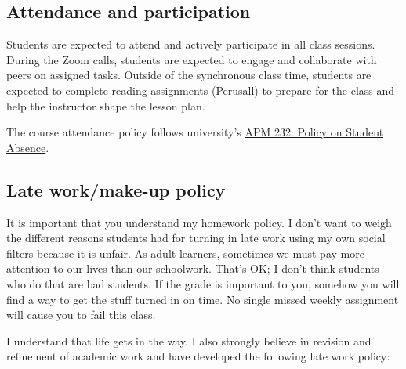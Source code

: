 \hypertarget{attendance-and-participation}{%
\subsection{Attendance and
participation}\label{attendance-and-participation}}

Students are expected to attend and actively participate in all class
sessions. During the Zoom calls, students are expected to engage and
collaborate with peers on assigned tasks. Outside of the synchronous
class time, students are expected to complete reading assignments
(Perusall) to prepare for the class and help the instructor shape the
lesson plan.

The course attendance policy follows university's
\href{http://www.fresnostate.edu/academics/facultyaffairs/documents/apm/232.pdf}{APM
232: Policy on Student Absence}.

\hypertarget{late-workmake-up-policy}{%
\subsection{Late work/make-up policy}\label{late-workmake-up-policy}}

It is important that you understand my homework policy. I don't want to
weigh the different reasons students had for turning in late work using
my own social filters because it is unfair. As adult learners, sometimes
we must pay more attention to our lives than our schoolwork. That's OK;
I don't think students who do that are bad students. If the grade is
important to you, somehow you will find a way to get the stuff turned in
on time. No single missed weekly assignment will cause you to fail this
class.

I understand that life gets in the way. I also strongly believe in
revision and refinement of academic work and have developed the
following late work policy:

